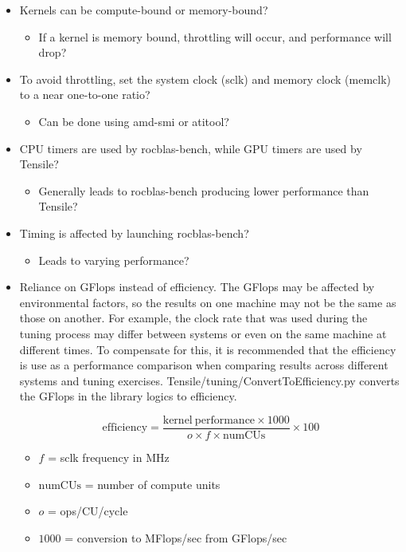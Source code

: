 \documentclass[]{article}
\begin{document}
\begin{itemize}

\item Kernels can be compute-bound or memory-bound?

 \begin{itemize}
 	\item If a kernel is memory bound, throttling will occur, and performance will drop?
 \end{itemize}

\item To avoid throttling, set the system clock (sclk) and memory clock (memclk) to a near one-to-one ratio?

  \begin{itemize}
  	\item Can be done using amd-smi or atitool?
  \end{itemize}

\item CPU timers are used by rocblas-bench, while GPU timers are used by Tensile?

  \begin{itemize}
   	\item Generally leads to rocblas-bench producing lower performance than Tensile?
  \end{itemize}

\item Timing is affected by launching rocblas-bench?

  \begin{itemize}
  	\item Leads to varying performance?
  \end{itemize}

\item \label{sec:efficiency} Reliance on GFlops instead of efficiency. The GFlops may be affected by environmental factors, so the results on one machine may not be the same as those on another. For example, the clock rate that was used during the tuning process may differ between systems or even on the same machine at different times. To compensate for this, it is recommended that the efficiency is use as a performance comparison when comparing results across different systems and tuning exercises. Tensile/tuning/ConvertToEfficiency.py converts the GFlops in the library logics to efficiency.

$$ \mathrm{efficiency} = \frac{\mathrm{kernel\ performance} \times 1000}{o \times f \times \mathrm{numCUs}} \times 100 $$

\begin{itemize}
	\item $f$ = sclk frequency in MHz
	\item $\mathrm{numCUs}$ = number of compute units
	\item $o$ = ops/CU/cycle
	\item $1000$ = conversion to MFlops/sec from GFlops/sec
\end{itemize}

\end{itemize}
\end{document}
